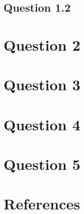 \documentclass{assignment}
\begin{document}
\subsection{Question 1.2}

\section{Question 2}

\section{Question 3}

\section{Question 4}

\section{Question 5}




\newpage
\section{References}
\nocite{*} 
   
     
\end{document}
